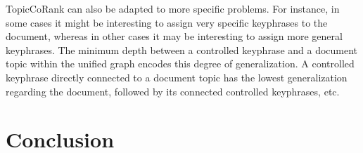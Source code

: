       TopicCoRank can also be adapted to more specific problems. For instance,
      in some cases it might be interesting to assign very specific keyphrases to the
      document, whereas in other cases it may be interesting to assign more general keyphrases. The
      minimum depth between a controlled keyphrase and a document topic within the unified graph encodes this
      degree of generalization. A controlled keyphrase directly connected to a
      document topic has the lowest generalization regarding the document,
      followed by its connected controlled keyphrases, etc.


  \section{Conclusion}
  \label{sec:main-automatic_keyphrase_annotation-conclusion}

